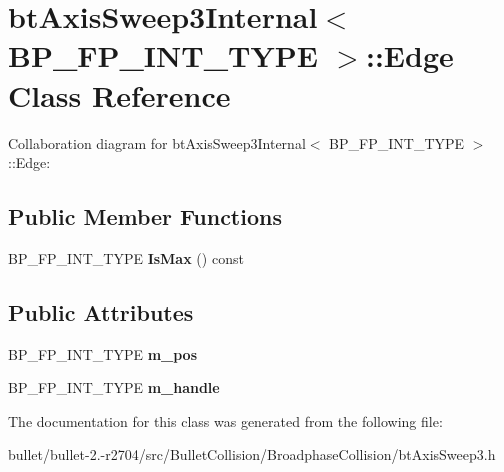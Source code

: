 \hypertarget{classbt_axis_sweep3_internal_1_1_edge}{\section{bt\+Axis\+Sweep3\+Internal$<$ B\+P\+\_\+\+F\+P\+\_\+\+I\+N\+T\+\_\+\+T\+Y\+P\+E $>$\+:\+:Edge Class Reference}
\label{classbt_axis_sweep3_internal_1_1_edge}
}


Collaboration diagram for bt\+Axis\+Sweep3\+Internal$<$ B\+P\+\_\+\+F\+P\+\_\+\+I\+N\+T\+\_\+\+T\+Y\+P\+E $>$\+:\+:Edge\+:
\subsection*{Public Member Functions}
\begin{DoxyCompactItemize}
\item 
\hypertarget{classbt_axis_sweep3_internal_1_1_edge_a5490144f188d7ac487fd62ecf15e53cd}{B\+P\+\_\+\+F\+P\+\_\+\+I\+N\+T\+\_\+\+T\+Y\+P\+E {\bfseries Is\+Max} () const }\label{classbt_axis_sweep3_internal_1_1_edge_a5490144f188d7ac487fd62ecf15e53cd}

\end{DoxyCompactItemize}
\subsection*{Public Attributes}
\begin{DoxyCompactItemize}
\item 
\hypertarget{classbt_axis_sweep3_internal_1_1_edge_a9b0b2af45ac13557b01cac97d989871e}{B\+P\+\_\+\+F\+P\+\_\+\+I\+N\+T\+\_\+\+T\+Y\+P\+E {\bfseries m\+\_\+pos}}\label{classbt_axis_sweep3_internal_1_1_edge_a9b0b2af45ac13557b01cac97d989871e}

\item 
\hypertarget{classbt_axis_sweep3_internal_1_1_edge_a32417224d95d115bfee25315233d815e}{B\+P\+\_\+\+F\+P\+\_\+\+I\+N\+T\+\_\+\+T\+Y\+P\+E {\bfseries m\+\_\+handle}}\label{classbt_axis_sweep3_internal_1_1_edge_a32417224d95d115bfee25315233d815e}

\end{DoxyCompactItemize}


The documentation for this class was generated from the following file\+:\begin{DoxyCompactItemize}
\item 
bullet/bullet-\/2.-\/r2704/src/\+Bullet\+Collision/\+Broadphase\+Collision/bt\+Axis\+Sweep3.\+h\end{DoxyCompactItemize}
